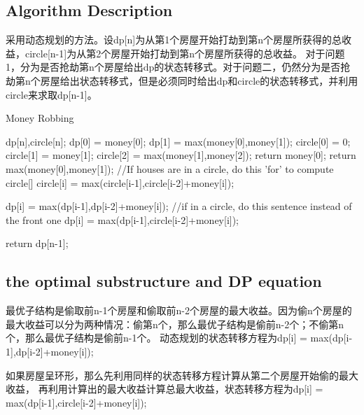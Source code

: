 \documentclass{article}
\begin{document}
\subsection{Algorithm Description}
采用动态规划的方法。设dp[n]为从第1个房屋开始打劫到第n个房屋所获得的总收益，circle[n-1]为从第2个房屋开始打劫到第n个房屋所获得的总收益。
对于问题1，分为是否抢劫第n个房屋给出dp的状态转移式。对于问题二，仍然分为是否抢劫第n个房屋给出状态转移式，但是必须同时给出dp和circle的状态转移式，并利用circle来求取dp[n-1]。
\begin{algorithm}[htbp]
  \caption{Money Robbing}  
  \begin{algorithmic}[1] 
	\State dp[n],circle[n];
  \State dp[0] = money[0];
  \State dp[1] = max(money[0],money[1]);
  \State circle[0] = 0;
  \State circle[1] = money[1];
  \State circle[2] = max(money[1],money[2]);
	 \State return money[0];
  \EndIf 
	 \State return max(money[0],money[1]);
  \EndIf
  \State //If houses are in a circle, do this 'for' to compute circle[]
  \State circle[i] = max(circle[i-1],circle[i-2]+money[i]);
  \EndFor
  
  \State dp[i] = max(dp[i-1],dp[i-2]+money[i]);
  \State //if in a circle, do this sentence instead of the front one
  \State dp[i] = max(dp[i-1],circle[i-2]+money[i]);
  \EndFor

  \State return dp[n-1];
    \EndFunction 
  \end{algorithmic}  
\end{algorithm} 
\newpage
\subsection{the optimal substructure and DP equation}
最优子结构是偷取前n-1个房屋和偷取前n-2个房屋的最大收益。因为偷n个房屋的最大收益可以分为两种情况：偷第n个，那么最优子结构是偷前n-2个；不偷第n个，那么最优子结构是偷前n-1个。
动态规划的状态转移方程为dp[i] = max(dp[i-1],dp[i-2]+money[i]);


如果房屋呈环形，那么先利用同样的状态转移方程计算从第二个房屋开始偷的最大收益，
再利用计算出的最大收益计算总最大收益，状态转移方程为dp[i] = max(dp[i-1],circle[i-2]+money[i]);
\end{document}
